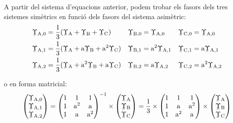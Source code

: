 A partir del sistema d'equacions anterior, podem trobar els fasors
dels tres sistemes sim\`{e}trics en funci\'{o} dels fasors del sistema
asim\`{e}tric:
\begin{subequations}
\begin{align}
   \cmplx{\Upsilon}\ped{A,0} &= \frac{1}{3} (\cmplx{\Upsilon}\ped{A} + \cmplx{\Upsilon}\ped{B} +
   \cmplx{\Upsilon}\ped{C}) & \cmplx{\Upsilon}\ped{B,0} &= \cmplx{\Upsilon}\ped{A,0} &
   \cmplx{\Upsilon}\ped{C,0} &= \cmplx{\Upsilon}\ped{A,0}
   \label{eq:c_sim_c2}\\
   \cmplx{\Upsilon}\ped{A,1} &= \frac{1}{3} (\cmplx{\Upsilon}\ped{A} + \au \cmplx{\Upsilon}\ped{B} +
   \au^2 \cmplx{\Upsilon}\ped{C}) & \cmplx{\Upsilon}\ped{B,1} &= \au^2 \cmplx{\Upsilon}\ped{A,1} &
   \cmplx{\Upsilon}\ped{C,1} &= \au \cmplx{\Upsilon}\ped{A,1} \label{eq:c_sim_a2} \\
   \cmplx{\Upsilon}\ped{A,2} &= \frac{1}{3} (\cmplx{\Upsilon}\ped{A} + \au^2 \cmplx{\Upsilon}\ped{B} +
   \au \cmplx{\Upsilon}\ped{C}) & \cmplx{\Upsilon}\ped{B,2} &= \au \cmplx{\Upsilon}\ped{A,2} &
   \cmplx{\Upsilon}\ped{C,2} &= \au^2 \cmplx{\Upsilon}\ped{A,2} \label{eq:c_sim_b2}
\end{align}
\end{subequations}

o en forma matricial:
\begin{equation}
   \begin{pmatrix}
     \cmplx{\Upsilon}\ped{A,0} \\
     \cmplx{\Upsilon}\ped{A,1} \\
     \cmplx{\Upsilon}\ped{A,2}
   \end{pmatrix} =
   \begin{pmatrix}
     1 & 1 & 1 \\
     1 & \au^2 & \au\\
     1 & \au & \au^2
   \end{pmatrix}^{-1} \times
   \begin{pmatrix}
     \cmplx{\Upsilon}\ped{A} \\
     \cmplx{\Upsilon}\ped{B} \\
     \cmplx{\Upsilon}\ped{C}
   \end{pmatrix} =  \frac{1}{3} \times
   \begin{pmatrix}
     1 & 1 & 1 \\
     1 & \au & \au^2 \\
     1 & \au^2 & \au
   \end{pmatrix} \times
   \begin{pmatrix}
     \cmplx{\Upsilon}\ped{A} \\
     \cmplx{\Upsilon}\ped{B} \\
     \cmplx{\Upsilon}\ped{C}
   \end{pmatrix}
\end{equation}

